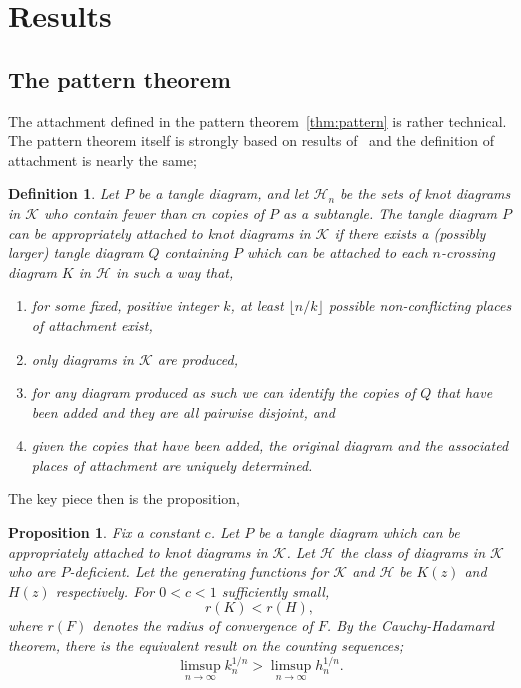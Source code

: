 \documentclass[submission%
]{dmtcs}
\newcommand{\KnotDiaClass}{\mathscr{K}}
\newcommand{\KnotDiaGF}{K}
\newcommand{\KnotDiaCard}{k}
\newtheorem{proposition}{Proposition}
\newtheorem*{definition}{Definition}
\begin{document}
\section{Results}

\subsection{The pattern theorem}
\label{sec:pattern}

The attachment defined in the pattern theorem~\ref{thm:pattern} is
rather technical. The pattern theorem itself is strongly based on
results of~\cite{Bender1992104} and the definition of attachment is
nearly the same;

\begin{definition}
  Let $P$ be a tangle diagram, and let $\mathscr{H}_n$ be the sets of
  knot diagrams in $\KnotDiaClass$ who contain fewer than $cn$ copies
  of $P$ as a subtangle. The tangle diagram $P$ can be
  \emph{appropriately attached} to knot diagrams in $\KnotDiaClass$ if
  there exists a (possibly larger) tangle diagram $Q$ containing $P$
  which can be attached to each $n$-crossing diagram $K$ in
  $\mathscr{H}$ in such a way that,
  \begin{enumerate}
  \item for some fixed, positive integer $k$, at least
    $\lfloor n/k \rfloor$ possible non-conflicting places of
    attachment exist,
  \item only diagrams in $\KnotDiaClass$ are produced,
  \item for any diagram produced as such we can identify the copies of
    $Q$ that have been added and they are all pairwise disjoint, and
  \item given the copies that have been added, the original diagram
    and the associated places of attachment are uniquely determined.
  \end{enumerate}
\end{definition}
The key piece then is the proposition,

\begin{proposition}
  Fix a constant $c$. Let $P$ be a tangle diagram which can be
  appropriately attached to knot diagrams in $\KnotDiaClass$. Let
  $\mathscr{H}$ the class of diagrams in $\KnotDiaClass$ who are
  $P$-deficient. Let the generating functions for
  $\KnotDiaClass$ and $\mathscr{H}$ be $\KnotDiaGF(z)$ and $H(z)$
  respectively. For $0 < c < 1$ sufficiently small,
  \begin{displaymath}
    r(\KnotDiaGF) < r(H),
  \end{displaymath}
  where $r(F)$ denotes the radius of convergence of $F$. By the
  Cauchy-Hadamard theorem, there is the equivalent result on the
  counting sequences;
  \begin{displaymath}
    \limsup_{n\to\infty}{\KnotDiaCard_n^{1/n}} > \limsup_{n\to\infty}{h_n^{1/n}}.
  \end{displaymath}
\end{proposition}
\end{document}
